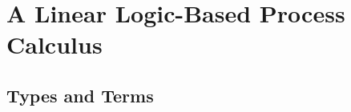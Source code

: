\documentclass[orivec,envcountsame]{llncs}
\makeatletter
\newcommand{\uto}{\ensuremath{\rightarrow}}
\newcommand{\outterm}{\mathrm{end}_!}
\newcommand{\mkwd}[1]{\mathsf{#1}}
\newcommand{\clabel}[1]{\mathit{#1}}
\newcommand{\gvreceive}[1]{\mkwd{receive}\:#1}
\newcommand{\gvlet}[3]{\mkwd{let}\;#1 = #2\;\mkwd{in}\;#3}
\newcommand{\gvselect}[2]{\mkwd{select}\:#1\:#2}
\newcommand{\gvfork}[2]{\mkwd{fork}\:#1.#2}
\newcommand{\ba}{\begin{array}}
\newcommand{\ea}{\end{array}}
\newcommand{\bl}{\ba[t]{@{}l@{}}}
\newcommand{\el}{\ea}
\makeatother
\begin{document}
%

\section{A Linear Logic-Based Process Calculus}\label{sec:mucp}

\subsection{Types and Terms}
\end{document}
